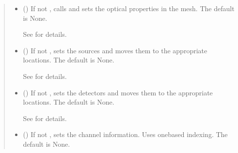 \documentclass[letterpaper,10pt,english]{sphinxmanual}
\begin{document}
\begin{fulllineitems}
\begin{fulllineitems}
\begin{quote}
\begin{description}
\begin{itemize}
\item {} 
\sphinxAtStartPar
{} (\sphinxstyleliteralemphasis{\sphinxupquote{, }}) \textendash{} 
\sphinxAtStartPar
If not , calls  and sets the optical properties in the mesh. The default is None.

\sphinxAtStartPar
See {\hyperref[\detokenize{_autosummary/nirfasterff.base.fluor_mesh.fluormesh:nirfasterff.base.fluor_mesh.fluormesh.set_prop}]{}} for details.


\item {} 
\sphinxAtStartPar
{} (\sphinxstyleliteralemphasis{\sphinxupquote{, }}) \textendash{} 
\sphinxAtStartPar
If not , sets the sources and moves them to the appropriate locations. The default is None.

\sphinxAtStartPar
See {\hyperref[\detokenize{_autosummary/nirfasterff.base.optodes.optode:nirfasterff.base.optodes.optode.touch_sources}]{}} for details.


\item {} 
\sphinxAtStartPar
{} (\sphinxstyleliteralemphasis{\sphinxupquote{, }}) \textendash{} 
\sphinxAtStartPar
If not , sets the detectors and moves them to the appropriate locations. The default is None.

\sphinxAtStartPar
See {\hyperref[\detokenize{_autosummary/nirfasterff.base.optodes.optode:nirfasterff.base.optodes.optode.touch_detectors}]{}} for details.


\item {} 
\sphinxAtStartPar
{} (\sphinxstyleliteralemphasis{\sphinxupquote{, }}) \textendash{} 
\sphinxAtStartPar
If not , sets the channel information. Uses one\sphinxhyphen{}based indexing. The default is None.


\end{itemize}
\end{description}
\end{quote}
\end{fulllineitems}
\end{fulllineitems}
\end{document}
